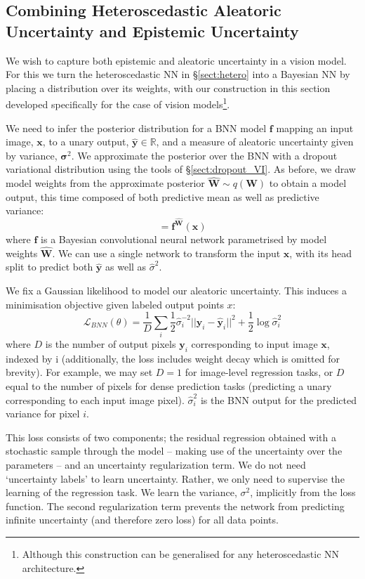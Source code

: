 \documentclass{article}
\newcommand{\cL}{\mathcal{L}}
\newcommand{\f}{\mathbf{f}}
\newcommand{\x}{\mathbf{x}}
\newcommand{\y}{\mathbf{y}}
\newcommand{\W}{\mathbf{W}}
\newcommand{\Wh}{{\widehat{\mathbf{W}}}}
\begin{document}
\subsection{Combining Heteroscedastic Aleatoric Uncertainty and Epistemic Uncertainty}

We wish to capture both epistemic and aleatoric uncertainty in a vision model.
For this we turn the heteroscedastic NN in \S\ref{sect:hetero} into a Bayesian NN by placing a distribution over its weights, with our construction in this section developed specifically for the case of vision models\footnote{Although this construction can be generalised for any heteroscedastic NN architecture.}.

We need to infer the posterior distribution for a BNN model $\f$ mapping an input image, $\x$, to a unary output, $\hat{\y} \in \mathbb{R}$, and a measure of aleatoric uncertainty given by variance, $\mathbf{\sigma}^2$. We approximate the posterior over the BNN with a dropout variational distribution using the tools of \S\ref{sect:dropout_VI}. 
As before, we draw model weights from the approximate posterior $\Wh \sim q(\W)$ to obtain a model output, this time composed of both predictive mean as well as predictive variance:
\begin{equation}
[\hat{\y}, \hat{\mathbf{\sigma}}^2] = \f^{\Wh}(\textbf{x})
\end{equation}
where $\f$ is a Bayesian convolutional neural network parametrised by model weights $\Wh$. We can use a single network to transform the input $\x$, with its head split to predict both $\hat{\y}$ as well as $\hat{\sigma}^2$.

We fix a Gaussian likelihood to model our aleatoric uncertainty.
This induces a minimisation objective given labeled output points $x$:
\begin{equation}
\cL_{BNN}(\theta) = \frac{1}{D} \sum_i \frac{1}{2} \hat{\sigma}^{-2}_i ||\y_i-\hat{\y}_i||^2 + \frac{1}{2} \log{\hat{\sigma}_i^2}
\end{equation}
where $D$ is the number of output pixels $\y_i$ corresponding to input image $\x$, indexed by i (additionally, the loss includes weight decay which is omitted for brevity). For example, we may set $D=1$ for image-level regression tasks, or $D$ equal to the number of pixels for dense prediction tasks (predicting a unary corresponding to each input image pixel). $\hat{\sigma}^2_i$ is the BNN output for the predicted variance for pixel $i$.

This loss consists of two components; the residual regression obtained with a stochastic sample through the model -- making use of the uncertainty over the parameters  -- and an uncertainty regularization term. We do not need `uncertainty labels' to learn uncertainty. Rather, we only need to supervise the learning of the regression task. We learn the variance, $\sigma^2$, implicitly from the loss function. The second regularization term prevents the network from predicting infinite uncertainty (and therefore zero loss) for all data points.
\end{document}
